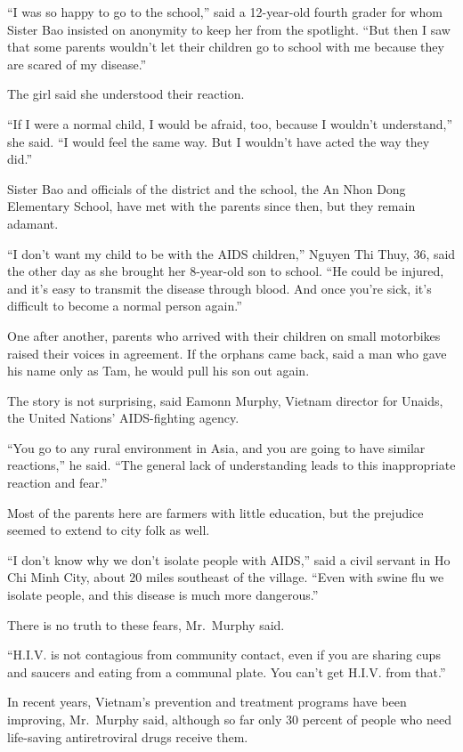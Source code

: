 ﻿\documentclass[12pt]{article}
\begin{document}
``I was so happy to go to the school,'' said a 12-year-old fourth grader for whom Sister Bao
insisted on anonymity to keep her from the spotlight. ``But then I saw that some parents wouldn't
let their children go to school with me because they are scared of my disease.''

The girl said she understood their reaction.

``If I were a normal child, I would be afraid, too, because I wouldn't understand,'' she said. ``I
would feel the same way. But I wouldn't have acted the way they did.''

Sister Bao and officials of the district and the school, the An Nhon Dong Elementary School, have
met with the parents since then, but they remain adamant.

``I don't want my child to be with the AIDS children,'' Nguyen Thi Thuy, 36, said the other day as
she brought her 8-year-old son to school. ``He could be injured, and it's easy to transmit the
disease through blood. And once you're sick, it's difficult to become a normal person again.''

One after another, parents who arrived with their children on small motorbikes raised their voices
in agreement. If the orphans came back, said a man who gave his name only as Tam, he would pull his
son out again.

The story is not surprising, said Eamonn Murphy, Vietnam director for Unaids, the United Nations'
AIDS-fighting agency.

``You go to any rural environment in Asia, and you are going to have similar reactions,'' he said.
``The general lack of understanding leads to this inappropriate reaction and fear.''

Most of the parents here are farmers with little education, but the prejudice seemed to extend to
city folk as well.

``I don't know why we don't isolate people with AIDS,'' said a civil servant in Ho Chi Minh City,
about 20 miles southeast of the village. ``Even with swine flu we isolate people, and this disease
is much more dangerous.''

There is no truth to these fears, Mr.~Murphy said.

``H.I.V. is not contagious from community contact, even if you are sharing cups and saucers and
eating from a communal plate. You can't get H.I.V. from that.''

In recent years, Vietnam's prevention and treatment programs have been improving, Mr.~Murphy said,
although so far only 30 percent of people who need life-saving antiretroviral drugs receive them.
\end{document}
